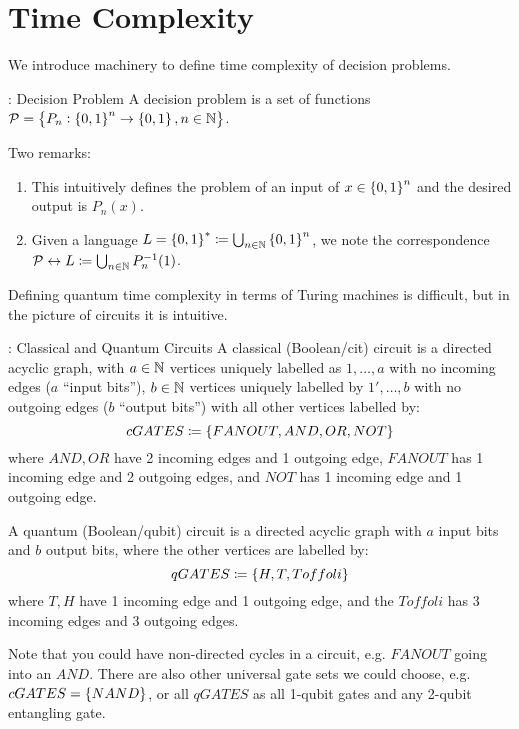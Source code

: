 \section{Time Complexity}
We introduce machinery to define time complexity of decision problems.
\begin{defbox}{: Decision Problem}
    A decision problem is a set of functions $\mathcal{P} = \set{P_n: \set{0, 1}^n \to \set{0, 1}, n \in \mathbb{N}}$.
\end{defbox}
Two remarks:
\begin{enumerate}
    \item This intuitively defines the problem of an input of $x \in \set{0, 1}^n$ and the desired output is $P_n(x)$. 
    \item Given a language $L = \set{0, 1}^* \coloneqq \bigcup_{n \in \mathbb{N}}\set{0, 1}^n$, we note the correspondence $\mathcal{P} \leftrightarrow L \coloneqq \bigcup_{n \in \mathbb{N}}P_n^{-1}(1)$.
\end{enumerate}
Defining quantum time complexity in terms of Turing machines is difficult, but in the picture of circuits it is intuitive.

\begin{defbox}{: Classical and Quantum Circuits}
    A classical (Boolean/cit) circuit is a directed acyclic graph, with $a \in \mathbb{N}$ vertices uniquely labelled as $1, \ldots, a$ with no incoming edges ($a$ ``input bits''), $b \in \mathbb{N}$ vertices uniquely labelled by $1', \ldots, b$ with no outgoing edges ($b$ ``output bits'') with all other vertices labelled by:
    \begin{equation}
        cGATES \coloneqq \set{FANOUT, AND, OR, NOT}
    \end{equation}
    where $AND, OR$ have 2 incoming edges and 1 outgoing edge, $FANOUT$ has 1 incoming edge and 2 outgoing edges, and $NOT$ has 1 incoming edge and 1 outgoing edge. 

    A quantum (Boolean/qubit) circuit is a directed acyclic graph with $a$ input bits and $b$ output bits, where the other vertices are labelled by:
    \begin{equation}
        qGATES \coloneqq \set{H, T, Toffoli}
    \end{equation}
    where $T, H$ have 1 incoming edge and 1 outgoing edge, and the $Toffoli$ has 3 incoming edges and 3 outgoing edges.
\end{defbox}
Note that you could have non-directed cycles in a circuit, e.g. $FANOUT$ going into an $AND$. There are also other universal gate sets we could choose, e.g. $cGATES = \set{NAND}$, or all $qGATES$ as all 1-qubit gates and any 2-qubit entangling gate.


